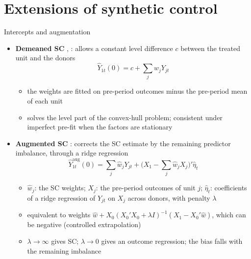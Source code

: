 \section{Extensions of synthetic control}

\begin{frame}{Intercepts and augmentation}
\itemsize{\small}
\begin{itemize}
    \item \textbf{Demeaned SC} , : allows a constant level difference $c$ between the treated unit and the donors \[ \hat Y_{1t}(0) = c + \sum_j w_jY_{jt} \]
    \begin{itemize}
        \item the weights are fitted on pre-period outcomes minus the pre-period mean of each unit
        \item solves the level part of the convex-hull problem; consistent under imperfect pre-fit when the factors are stationary 
    \end{itemize}
    \item \textbf{Augmented SC} : corrects the SC estimate by the remaining predictor imbalance, through a ridge regression \[ \hat Y^{\mathrm{aug}}_{1t}(0) = \sum_j\hat w_jY_{jt} + \Big(X_1 - \sum_j\hat w_jX_j\Big)'\hat\eta_t \]
    \begin{itemize}
        \item $\hat w_j$: the SC weights; $X_j$: the pre-period outcomes of unit $j$; $\hat\eta_t$: coefficients of a ridge regression of $Y_{jt}$ on $X_j$ across donors, with penalty $\lambda$
        \item equivalent to weights $\hat w + X_0(X_0'X_0 + \lambda I)^{-1}(X_1 - X_0'\hat w)$, which can be negative (controlled extrapolation)
        \item $\lambda \to \infty$ gives SC; $\lambda \to 0$ gives an outcome regression; the bias falls with the remaining imbalance
    \end{itemize}
\end{itemize}
\end{frame}

